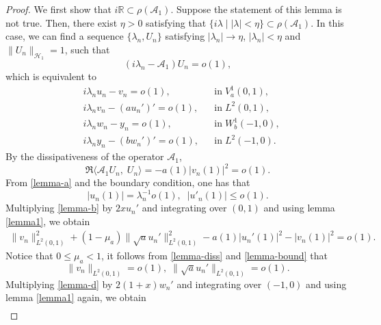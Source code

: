 \documentclass[twoside]{article}
\theoremstyle{noparens}
\theoremstyle{definition}
\numberwithin{equation}{section}
\numberwithin{figure}{section}
\begin{document}
\begin{proof}
We first show that $i\mathbb R\subset\rho(\mathcal A_1)$. Suppose the statement of this lemma is not true. Then, there exist $\eta>0$ satisfying that $\{i\lambda\;|\;|\lambda|<\eta\}\subset\rho(\mathcal A_1)$. In this case, we can find a sequence $\{\lambda_n,U_n\}$ satisfying $|\lambda_n|\to\eta$, $|\lambda_n|<\eta$ and $\|U_n\|_{\mathcal H_1} = 1$, such that $$(i\lambda_n - \mathcal A_1)U_n = o(1),$$
which is equivalent to
\begin{subequations}
	\begin{align}
		&i\lambda_n u_n - v_n = o(1),&&\mbox{in}\;V_a^1(0,1),\label{lemma-a}\\
		&i\lambda_n v_n - (au_n')' = o(1),&&\mbox{in}\;L^2(0,1),\label{lemma-b}\\
		&i\lambda_n w_n - y_n = o(1),&&\mbox{in}\;W_b^1(-1,0),\label{lemma-c}\\
		&i\lambda_ny_n - (bw_n')' = o(1),&&\mbox{in}\;L^2(-1,0).\label{lemma-d}
	\end{align}
\end{subequations}
By the dissipativeness of the operator $\mathcal A_1$,
\begin{equation}\label{lemma-diss}
	\Re\langle \mathcal A_1 U_n , \; U_n\rangle = - a(1)|v_n(1)|^2 = o(1).
\end{equation}
From \eqref{lemma-a} and the boundary condition, one has that
\begin{equation}\label{lemma-bound}
	|u_n(1)| = \lambda_n^{-1}o(1),\;\; |u'_n(1)| \leq  o(1).
\end{equation}
Multiplying \eqref{lemma-b} by $2xu_n'$ and integrating over $(0, 1)$ and using lemma \ref{lemma1}, we obtain
\begin{equation}
	\begin{split}
		\|v_n\|_{L^2(0,1)}^2 + (1-\mu_a)\|\sqrt a u_n'\|_{L^2(0,1)}^2-a(1)|u_n'(1)|^2 -|v_n(1)|^2= o(1).
	\end{split}
\end{equation}
Notice that $0\leq\mu_a<1$, it follows from \eqref{lemma-diss} and \eqref{lemma-bound}  that
\begin{equation}\label{lemma-u}
	\|v_n\|_{L^2(0,1)} = o(1),\; \|\sqrt{a}u_n'\|_{L^2(0,1)} = o(1).
\end{equation}
Multiplying \eqref{lemma-d} by $2(1+x)w_n'$ and integrating over $(-1,0)$ and using lemma \ref{lemma1} again, we obtain
\begin{equation}\label{lemma-w}
	\begin{gathered}

\end{gathered}
\end{equation}
\end{proof}
\end{document}
